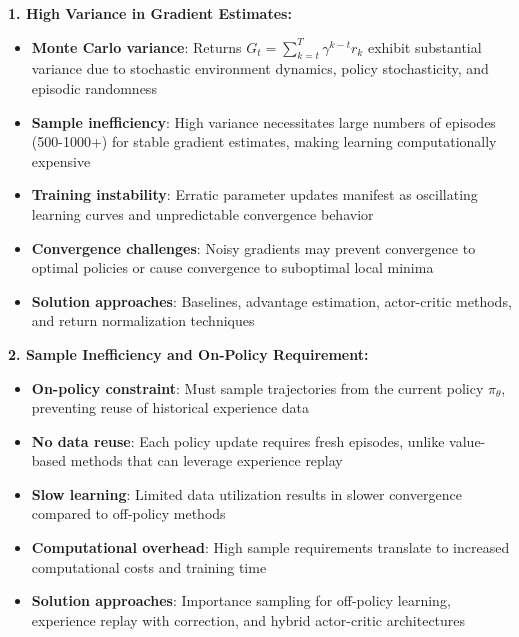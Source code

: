 \documentclass[12pt]{article}
\begin{document}
{{{\textbf{1. High Variance in Gradient Estimates:}
\begin{itemize}
    \item \textbf{Monte Carlo variance}: Returns $G_t = \sum_{k=t}^{T} \gamma^{k-t} r_k$ exhibit substantial variance due to stochastic environment dynamics, policy stochasticity, and episodic randomness
    \item \textbf{Sample inefficiency}: High variance necessitates large numbers of episodes (500-1000+) for stable gradient estimates, making learning computationally expensive
    \item \textbf{Training instability}: Erratic parameter updates manifest as oscillating learning curves and unpredictable convergence behavior
    \item \textbf{Convergence challenges}: Noisy gradients may prevent convergence to optimal policies or cause convergence to suboptimal local minima
    \item \textbf{Solution approaches}: Baselines, advantage estimation, actor-critic methods, and return normalization techniques
\end{itemize}

\textbf{2. Sample Inefficiency and On-Policy Requirement:}
\begin{itemize}
    \item \textbf{On-policy constraint}: Must sample trajectories from the current policy $\pi_\theta$, preventing reuse of historical experience data
    \item \textbf{No data reuse}: Each policy update requires fresh episodes, unlike value-based methods that can leverage experience replay
    \item \textbf{Slow learning}: Limited data utilization results in slower convergence compared to off-policy methods
    \item \textbf{Computational overhead}: High sample requirements translate to increased computational costs and training time
    \item \textbf{Solution approaches}: Importance sampling for off-policy learning, experience replay with correction, and hybrid actor-critic architectures
\end{itemize}

}}}
\end{document}

